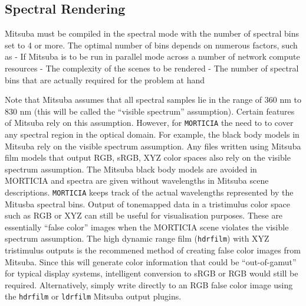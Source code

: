 \subsection{Spectral Rendering}\label{spectral-rendering}

Mitsuba must be compiled in the spectral mode with the number of
spectral bins set to 4 or more. The optimal number of bins depends on
numerous factors, such as - If Mitsuba is to be run in parallel mode
across a number of network compute resources - The complexity of the
scenes to be rendered - The number of spectral bins that are actually
required for the problem at hand

Note that Mitsuba assumes that all spectral samples lie in the range of
360 nm to 830 nm (this will be called the ``visible spectrum''
assumption). Certain features of Mitsuba rely on this assumption.
However, for \texttt{MORTICIA} the need to to cover any spectral region
in the optical domain. For example, the black body models in Mitsuba
rely on the visible spectrum assumption. Any files written using Mitsuba
film models that output RGB, sRGB, XYZ color spaces also rely on the
visible spectrum assumption. The Mitsuba black body models are avoided
in MORTICIA and spectra are given without wavelengths in Mitsuba scene
descriptions. \texttt{MORTICIA} keeps track of the actual wavelengths
represented by the Mitusba spectral bins. Output of tonemapped data in a
tristimulus color space such as RGB or XYZ can still be useful for
visualisation purposes. These are essentially ``false color'' images
when the MORTICIA scene violates the visible spectrum assumption. The
high dynamic range film (\texttt{hdrfilm}) with XYZ tristimulus outputs
is the recommened method of creating false color images from Mitsuba.
Since this will generate color information that could be
``out-of-gamut'' for typical display systems, intelligent conversion to
sRGB or RGB would still be required. Alternatively, simply write
directly to an RGB false color image using the \texttt{hdrfilm} or
\texttt{ldrfilm} Mitsuba output plugins.

